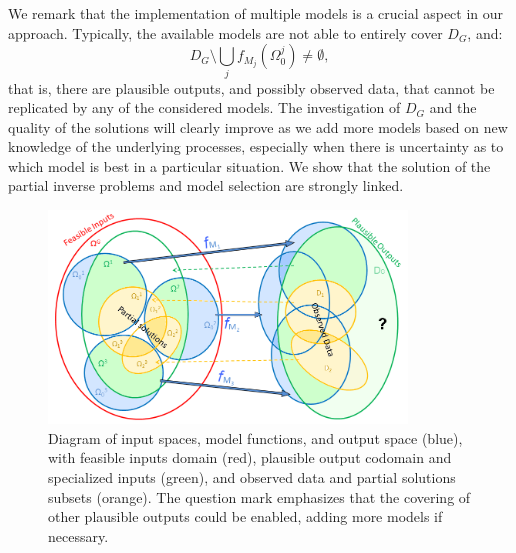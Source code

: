 \documentclass[nhess, manuscript]{copernicus}
\begin{document}
We remark that the implementation of multiple models is a crucial aspect in our approach. Typically, the available models are not able to entirely cover $D_G$, and:
$$D_G\setminus\bigcup_j f_{M_j}\left(\Omega^j_0\right)\neq \emptyset,$$
that is, there are plausible outputs, and possibly observed data, that cannot be replicated by any of the considered models.
The investigation of $D_G$ and the quality of the solutions will clearly improve as we add more models based on new knowledge of the underlying processes, especially when there is uncertainty as to which model is best in a particular situation. We show that the solution of the partial inverse problems and model selection are strongly linked.

\begin{figure}[H]
\centering
\includegraphics[width=0.85\textwidth]{Scheme_ok3.png}
\caption{Diagram of input spaces, model functions, and output space (blue), with feasible inputs domain (red), plausible output codomain and specialized inputs (green), and observed data and partial solutions subsets (orange). The question mark emphasizes that the covering of other plausible outputs could be enabled, adding more models if necessary.}
\label{scheme}
\end{figure}
\end{document}
